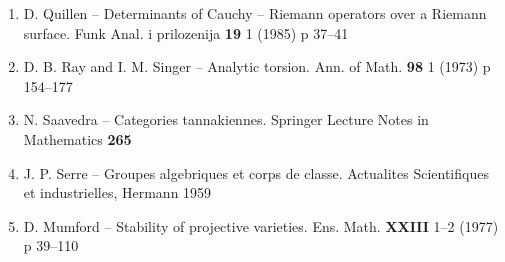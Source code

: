 \documentclass[12pt,a4paper]{article}
\theoremstyle{plain}
\theoremstyle{definition}
\theoremstyle{remark}
\begin{document}
\begin{enumerate}
\item[{[13]}] D. Quillen -- Determinants of Cauchy -- Riemann operators over a Riemann surface. Funk Anal. i prilozenija \textbf{19} 1 (1985) p 37--41

\item[{[14]}] D. B. Ray and I. M. Singer -- Analytic torsion. Ann. of Math. \textbf{98} 1 (1973) p 154--177

\item[{[15]}] N. Saavedra -- Categories tannakiennes. Springer Lecture Notes in Mathematics \textbf{265}

\item[{[16]}] J. P. Serre -- Groupes algebriques et corps de classe. Actualites Scientifiques et industrielles, Hermann 1959

\item[{[17]}] D. Mumford -- Stability of projective varieties. Ens. Math. \textbf{XXIII} 1--2 (1977) p 39--110
\end{enumerate}
\end{document}
